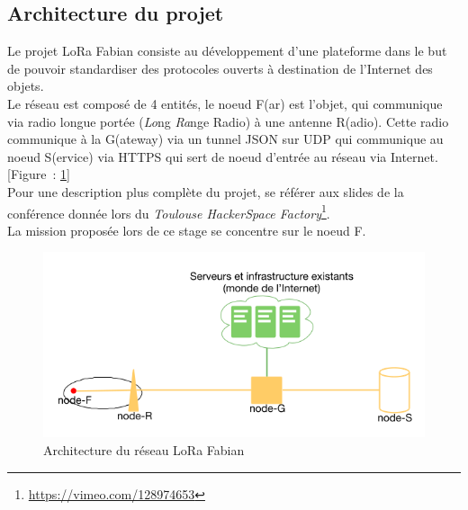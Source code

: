 \documentclass{article}
\begin{document}
\subsection{Architecture du projet}
Le projet LoRa Fabian consiste au développement d'une plateforme dans le but de pouvoir standardiser des protocoles ouverts à destination de l'Internet des objets.\\
Le réseau est composé de 4 entités, le noeud F(ar) est l'objet, qui communique via radio longue portée (\emph{Lo}ng \emph{Ra}nge Radio) à une antenne R(adio). Cette radio communique à la G(ateway) via un tunnel JSON sur UDP qui communique au noeud S(ervice) via \textsc{HTTPS} qui sert de noeud d'entrée au réseau via Internet. [Figure~: \ref{fig:archi}]\\
Pour une description plus complète du projet, se référer aux slides de la conférence donnée lors du \emph{Toulouse HackerSpace Factory}\footnote{\url{https://vimeo.com/128974653}}.\\
La mission proposée lors de ce stage se concentre sur le noeud F.
\begin{figure}[h]
	\begin{center}
		\includegraphics[scale=0.4]{../res/img/archi}
		\caption{Architecture du réseau LoRa Fabian}
		\label{fig:archi}
	\end{center}
\end{figure}
\end{document}
